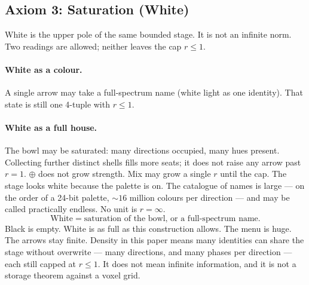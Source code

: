 \documentclass[12pt, a4paper]{article}
\begin{document}
\subsection{Axiom 3: Saturation (White)}
\label{subsec:axiom_white}
White is the upper pole of the same bounded stage. It is not an infinite
norm. Two readings are allowed; neither leaves the cap $r\le 1$.

\paragraph{White as a colour.}
A single arrow may take a full-spectrum name (white light as one
identity). That state is still one 4-tuple with $r\le 1$.

\paragraph{White as a full house.}
The bowl may be saturated: many directions occupied, many hues present.
Collecting further distinct shells fills more seats; it does not raise
any arrow past $r=1$. $\oplus$ does not grow strength. Mix may grow a
single $r$ until the cap. The stage looks white because the palette is on. The catalogue
of names is large --- on the order of a 24-bit palette,
$\sim 16$ million colours per direction --- and may be called
practically endless. No unit is $r=\infty$.
\begin{equation}
    \text{White} \;=\; \text{saturation of the bowl, or a full-spectrum name.}
    \label{eq:white_state}
\end{equation}
Black is empty. White is as full as this construction allows. The
menu is huge. The arrows stay finite.
Density in this paper means many identities can share the stage
without overwrite --- many directions, and many phases per direction
--- each still capped at $r\le 1$. It does not mean infinite
information, and it is not a storage theorem against a voxel grid.
\end{document}
